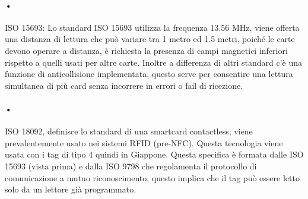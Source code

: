 \paragraph{•} ISO 15693: Lo standard ISO 15693 utilizza la frequenza 13.56 MHz, viene offerta una distanza di lettura che può variare tra 1 metro ed 1.5 metri, poiché le carte devono operare a distanza, è richiesta la presenza di campi magnetici inferiori rispetto a quelli usati per altre carte. Inoltre a differenza di altri standard c'è una funzione di anticollisione implementata, questo serve per consentire una lettura simultanea di più card senza incorrere in errori o fail di ricezione.
\paragraph{•} ISO 18092, definisce lo standard di una smartcard contactless, viene prevalentemente usato nei sistemi RFID (pre-NFC). Questa tecnologia  viene usata con i tag di tipo 4 quindi in Giappone. Questa specifica è formata dalle ISO 15693 (vista prima) e dalla ISO 9798 che regolamenta il protocollo di comunicazione a mutuo riconoscimento, questo implica che il tag può essere letto solo da un lettore già programmato.




